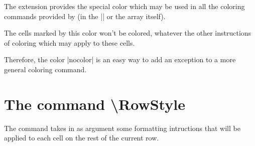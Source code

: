 \documentclass[dvipsnames]{article}%
\begin{document}

The extension  provides the special color 
which may be used in all the coloring commands provided by  (in
the |\CodeBefore| or the array itself).

The cells marked by this color won't be colored, whatever the other instructions
of coloring which may apply to these cells.

Therefore, the color |nocolor| is an easy way to add an exception to a more
general coloring command.

\section{The command \textbackslash RowStyle}

\label{RowStyle}


The command  takes in as argument some formatting
intructions that will be applied to each cell on the rest of the current row.
\end{document}
